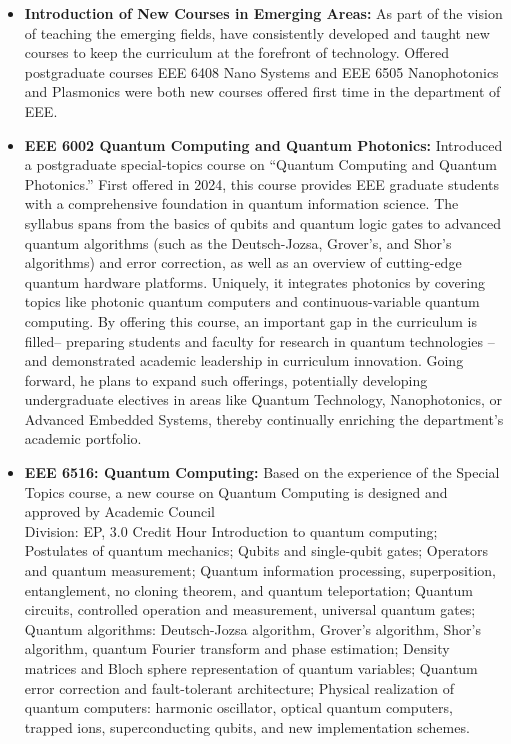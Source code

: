 \documentclass[cvauthor={Dr. Sajid Muhaimin Choudhury}]{buetcv}
\begin{document}
\begin{itemize}
    \item \textbf{Introduction of New Courses in Emerging Areas:} As part of the vision of teaching the emerging fields, have consistently developed and taught new courses to keep the curriculum at the forefront of technology. Offered postgraduate courses EEE 6408 Nano Systems and EEE 6505 Nanophotonics and Plasmonics were both new courses offered first time in the department of EEE. 
    \item \textbf{EEE 6002 Quantum Computing and Quantum Photonics:} Introduced a postgraduate special-topics course on “Quantum Computing and Quantum Photonics.” First offered in 2024, this course provides EEE graduate students with a comprehensive foundation in quantum information science. The syllabus spans from the basics of qubits and quantum logic gates to advanced quantum algorithms (such as the Deutsch-Jozsa, Grover’s, and Shor’s algorithms) and error correction, as well as an overview of cutting-edge quantum hardware platforms. Uniquely, it integrates photonics by covering topics like photonic quantum computers and continuous-variable quantum computing. By offering this course, an important gap in the curriculum is filled– preparing students and faculty for research in quantum technologies – and demonstrated academic leadership in curriculum innovation. Going forward, he plans to expand such offerings, potentially developing undergraduate electives in areas like Quantum Technology, Nanophotonics, or Advanced Embedded Systems, thereby continually enriching the department’s academic portfolio.
    \item \textbf{EEE 6516: Quantum Computing:}  Based on the experience of the Special Topics course, a new course on Quantum Computing is designed and approved by Academic Council \\
    Division: EP, 3.0 Credit Hour Introduction to quantum computing; Postulates of quantum mechanics; Qubits and single-qubit gates; Operators and quantum measurement; Quantum information processing, superposition, entanglement, no cloning theorem, and quantum teleportation; Quantum circuits, controlled operation and measurement, universal quantum gates; Quantum algorithms: Deutsch-Jozsa algorithm, Grover’s algorithm, Shor’s algorithm, quantum Fourier transform and phase estimation; Density matrices and Bloch sphere representation of quantum variables; Quantum error correction and fault-tolerant architecture; Physical realization of quantum computers: harmonic oscillator, optical quantum computers, trapped ions, superconducting qubits, and new implementation schemes.
\end{itemize}
 
\end{document}
